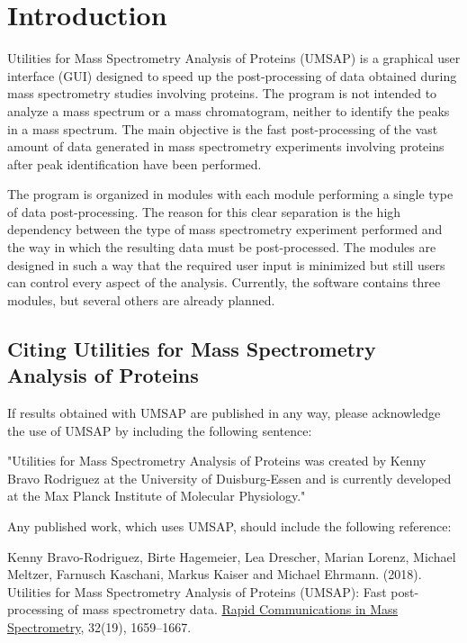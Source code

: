\chapter{Introduction}

Utilities for Mass Spectrometry Analysis of Proteins (UMSAP) is a graphical user
interface (GUI) designed to speed up the post-processing of data obtained during
mass spectrometry studies involving proteins. The program is not intended to
analyze a mass spectrum or a mass chromatogram, neither to identify the peaks
in a mass spectrum. The main objective is the fast post-processing of the vast
amount of data generated in mass spectrometry experiments involving proteins
after peak identification have been performed.

The program is organized in modules with each module performing a single type
of data post-processing. The reason for this clear separation is the high
dependency between the type of mass spectrometry experiment performed and the
way in which the resulting data must be post-processed. The modules are designed
in such a way that the required user input is minimized but still users can
control every aspect of the analysis. Currently, the software contains three
modules, but several others are already planned. 

\section{Citing Utilities for Mass Spectrometry Analysis of Proteins}

If results obtained with UMSAP are published in any way, please acknowledge the
use of UMSAP by including the following sentence:

"Utilities for Mass Spectrometry Analysis of Proteins was created by Kenny Bravo
Rodriguez at the University of Duisburg-Essen and is currently developed at the
Max Planck Institute of Molecular Physiology."

Any published work, which uses UMSAP, should include the following reference:

Kenny Bravo-Rodriguez, Birte Hagemeier, Lea Drescher, Marian Lorenz,
Michael Meltzer, Farnusch Kaschani, Markus Kaiser and Michael Ehrmann.
(\num{2018}). Utilities for Mass Spectrometry Analysis of Proteins (UMSAP): Fast
post-processing of mass spectrometry data.
\href{https://onlinelibrary.wiley.com/doi/10.1002/rcm.8243}{Rapid Communications
in Mass Spectrometry}, \num{32}(\num{19}),
\numrange[range-phrase = --]{1659}{1667}.

